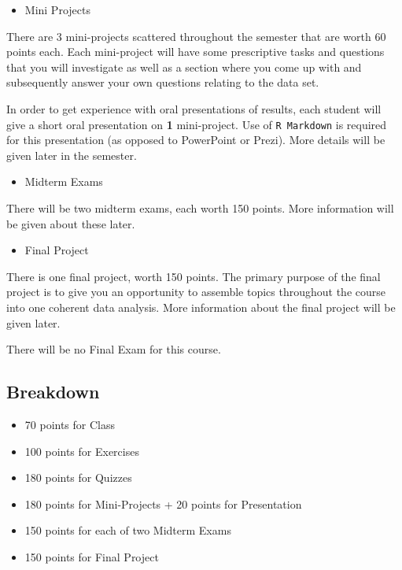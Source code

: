 \documentclass[
]{book}
\providecommand{\tightlist}{%
  \setlength{\itemsep}{0pt}\setlength{\parskip}{0pt}}
\begin{document}
\begin{itemize}
\tightlist
\item
  Mini Projects
\end{itemize}

There are 3 mini-projects scattered throughout the semester that are worth 60 points each. Each mini-project will have some prescriptive tasks and questions that you will investigate as well as a section where you come up with and subsequently answer your own questions relating to the data set.

In order to get experience with oral presentations of results, each student will give a short oral presentation on \textbf{1} mini-project. Use of \texttt{R\ Markdown} is required for this presentation (as opposed to PowerPoint or Prezi). More details will be given later in the semester.

\begin{itemize}
\tightlist
\item
  Midterm Exams
\end{itemize}

There will be two midterm exams, each worth 150 points. More information will be given about these later.

\begin{itemize}
\tightlist
\item
  Final Project
\end{itemize}

There is one final project, worth 150 points. The primary purpose of the final project is to give you an opportunity to assemble topics throughout the course into one coherent data analysis. More information about the final project will be given later.

There will be no Final Exam for this course.

\hypertarget{breakdown}{%
\subsection{Breakdown}\label{breakdown}}

\begin{itemize}
\tightlist
\item
  70 points for Class
\item
  100 points for Exercises
\item
  180 points for Quizzes
\item
  180 points for Mini-Projects + 20 points for Presentation
\item
  150 points for each of two Midterm Exams
\item
  150 points for Final Project
\end{itemize}
\end{document}
